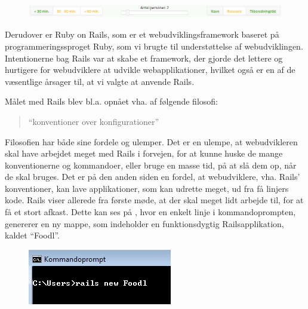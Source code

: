 \begin{figure}[H]
\centering
\includegraphics[scale=0.6]{billeder/jqueryuieksempel.png}
\label{fig:toolbar}
\end{figure}

Derudover er Ruby on Rails\cite{rubyonrailswiki}, som er et webudviklingsframework baseret på programmeringssproget Ruby, som vi brugte til understøttelse af webudviklingen. Intentionerne bag Rails var at skabe et framework, der gjorde det lettere og hurtigere for webudviklere at udvikle webapplikationer, hvilket også er en af de væsentlige årsager til, at vi valgte at anvende Rails. 

Målet med Rails blev bl.a. opnået vha. af følgende filosofi:
\begin{quote}
``konventioner over konfigurationer''
\end{quote} 

Filosofien har både sine fordele og ulemper. Det er en ulempe, at webudvikleren skal have arbejdet meget med Rails i forvejen, for at kunne huske de mange konventionerne og kommandoer, eller bruge en masse tid, på at slå dem op, når de skal bruges. Det er på den anden siden en fordel, at webudviklere, vha. Rails' konventioner, kan lave applikationer, som kan udrette meget, ud fra få linjers kode. Rails viser allerede fra første møde, at der skal meget lidt arbejde til, for at få et stort afkast. Dette kan ses på , hvor en enkelt linje i kommandoprompten, genererer en ny mappe, som indeholder en funktionsdygtig Railsapplikation, kaldet ``Foodl''.

\begin{figure}
	\centering
	\includegraphics[scale=0.6]{billeder/Rails-new-foodl.png}
	\label{fig:Rails-new-foodl}
\end{figure}

